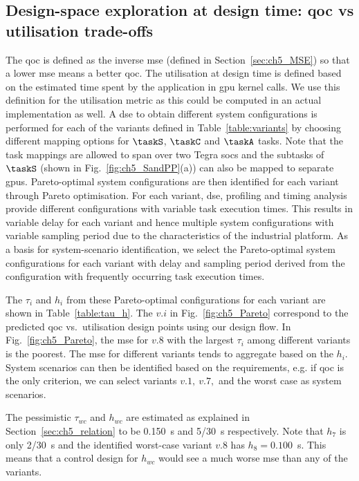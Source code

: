 \subsection{Design-space exploration at design time: \gls{qoc} vs utilisation trade-offs}
The \gls{qoc} is defined as the inverse \gls{mse} (defined in Section~\ref{sec:ch5_MSE}) so that a lower \gls{mse} means a better \gls{qoc}.
The utilisation at design time is defined based on the estimated time spent by the application in \gls{gpu} kernel calls. We use this definition for the utilisation metric as this could be computed in an actual implementation as well. 
A \gls{dse} to obtain different system configurations is performed for each of the variants defined in Table~\ref{table:variants} by choosing different mapping options for $\taskS$, $\taskC$ and $\taskA$ tasks.
Note that the task mappings are allowed to span over two Tegra \glspl{soc} and the subtasks of $\taskS$ (shown in Fig.~\ref{fig:ch5_SandPP}(a)) can also be mapped to separate \glspl{gpu}. Pareto-optimal system configurations are then identified for each variant through Pareto optimisation. 
For each variant, \gls{dse}, profiling and timing analysis provide different configurations with variable task execution times.
This results in variable delay for each variant and hence multiple system configurations with variable sampling period due to the characteristics of the industrial platform.
As a basis for system-scenario identification, we  select the Pareto-optimal system configurations for each variant with delay and sampling period derived from the configuration with frequently occurring task execution times.
 
The $\tau_i$ and $h_i$ from these Pareto-optimal configurations for each variant are shown in Table~\ref{table:tau_h}. The
$v.i$ in Fig.~\ref{fig:ch5_Pareto} correspond to the predicted \gls{qoc} vs.\ utilisation design points using our design flow. In Fig.~\ref{fig:ch5_Pareto}, the \gls{mse} for $v.8$ with the largest $\tau_i$ among different variants is the poorest. The \gls{mse} for different variants tends to aggregate based on the $h_i$. System scenarios can then be identified based on the requirements, e.g. if \gls{qoc} is the only criterion, we can select variants $v.1,\ v.7,$ and the worst case as system scenarios. 

The pessimistic $\tau_{wc}$ and $h_{wc}$ are estimated as explained in Section~\ref{sec:ch5_relation} to be 0.150~s and 5/30~s respectively.
Note that $h_7$ is only 2/30~s and the identified worst-case variant $v.8$ has $h_8=0.100$~s.
 This means that a control design for $h_{wc}$ would see a much worse \gls{mse} than any of the variants.  
 
